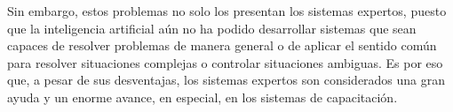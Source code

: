 Sin embargo, estos problemas no solo los presentan los sistemas expertos, puesto que la inteligencia artificial aún no ha podido desarrollar sistemas que
sean capaces de resolver problemas de manera general o de aplicar el sentido común para resolver situaciones complejas o controlar situaciones ambiguas. Es por eso que, a pesar de sus desventajas, los sistemas expertos son considerados una gran ayuda y un enorme avance, en especial, en los sistemas de capacitación.
